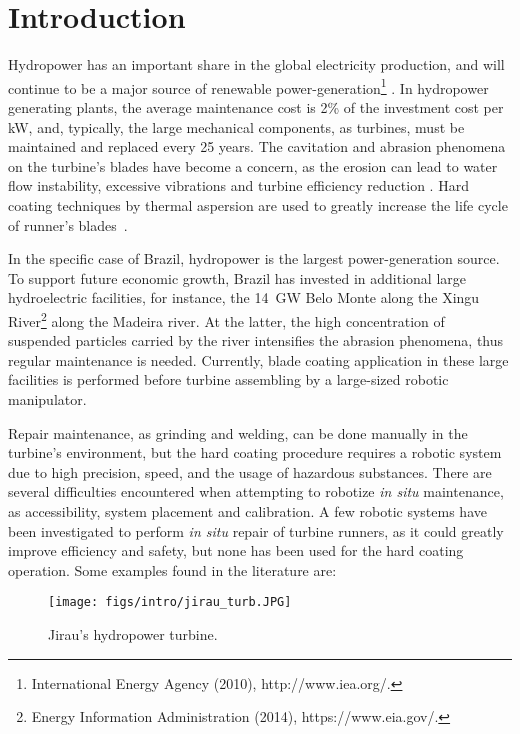 \section{Introduction}

Hydropower has an important share in the global electricity production, and
will continue to be a major source of renewable
power-generation\footnote{International Energy Agency (2010), http://www.iea.org/.}%
. In hydropower generating plants, the average maintenance cost is 2\% of the
investment cost per kW, and, typically, the large mechanical
components, as turbines, must be maintained and replaced every 25 years.
The cavitation and abrasion phenomena on the turbine's blades have become a
concern, as the erosion can lead to water flow instability, excessive
vibrations and turbine efficiency reduction \cite{goldemberg2007energia}. Hard
coating techniques by thermal aspersion are used to greatly increase the life
cycle of runner's blades~\cite{krella2011new}.

In the specific case of Brazil, hydropower is the largest power-generation
source. To support future economic growth, Brazil has invested in additional
large hydroelectric facilities, for instance, the 14~GW Belo Monte along the
Xingu River\footnote{Energy Information Administration (2014),
https://www.eia.gov/.}%
along the Madeira river. At the latter, the high concentration of suspended
particles carried by the river intensifies the abrasion phenomena, thus regular
maintenance is needed. Currently, blade coating application in these large
facilities is performed before turbine assembling by a large-sized robotic
manipulator.

Repair maintenance, as grinding and welding, can be done manually in the
turbine's environment, but the hard coating procedure requires a robotic system
due to high precision, speed, and the usage of hazardous substances.
There are several difficulties encountered when attempting to robotize
\textit{in situ} maintenance, as accessibility, system placement and
calibration. A few robotic systems have been investigated to perform \textit{in
situ} repair of turbine runners, as it could greatly improve efficiency and
safety, but none has been used for the hard coating operation. Some examples
found in the literature are:

\begin{figure}[h!]
\centering
	\texttt{[image: figs/intro/jirau\_turb.JPG]} 
	\caption{Jirau's hydropower turbine.}
	\label{fig::jirau_turb}
\end{figure}

